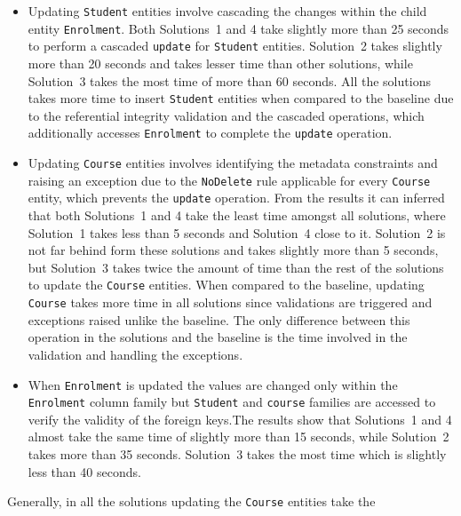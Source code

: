 	\begin{itemize}
	  \item Updating \texttt{Student} entities involve cascading the changes within the
	child entity \texttt{Enrolment}.
	Both Solutions~1 and 4 take slightly more than
	25 seconds to perform a cascaded \texttt{update} for \texttt{Student} entities.
	Solution~2 takes slightly more than 20 seconds and takes lesser time than other
	solutions, while Solution~3 takes the most time of more than 60 seconds. All the
	solutions takes more time to insert \texttt{Student} entities when compared to
	the baseline due to the referential integrity validation and the cascaded
	operations, which additionally accesses \texttt{Enrolment} to complete the
	\texttt{update} operation.
	
	  \item Updating \texttt{Course} entities involves identifying the metadata
	constraints and raising an exception due to the \texttt{NoDelete} rule applicable for every
	\texttt{Course} entity, which prevents the \texttt{update} operation. From the
	results it can inferred that both Solutions~1 and 4 take the least time amongst
	all solutions, where Solution~1 takes less than 5 seconds and Solution~4
	close to it. Solution~2 is not far behind form these solutions and
	takes slightly more than 5 seconds, but Solution~3 takes twice the amount of
	time than the rest of the solutions to update the \texttt{Course} entities.
	When compared to the baseline, updating \texttt{Course} takes more time in all
	solutions since  validations are triggered and  exceptions raised unlike the
	baseline. The only difference between this operation in the solutions and
	the baseline is the time involved in the validation and handling the
	exceptions.
	
	\item When \texttt{Enrolment} is updated the values are changed only within the
	\texttt{Enrolment} column family but \texttt{Student} and \texttt{course}
	families are accessed to verify the validity of the foreign keys.The results
	show that Solutions~1 and 4 almost take the same time of slightly more than 15
	seconds, while Solution~2 takes more than 35 seconds. Solution~3 takes the most
	time which is slightly less than 40 seconds. 
	\end{itemize}
Generally, in all the solutions updating the \texttt{Course} entities take the
